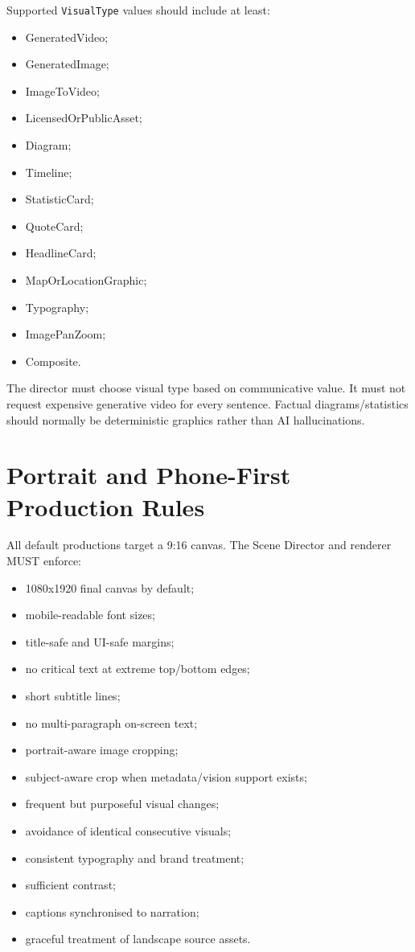 \documentclass[10pt,journal,compsoc]{IEEEtran}
\begin{document}
Supported \texttt{VisualType} values should include at least:
\begin{itemize}
    \item GeneratedVideo;
    \item GeneratedImage;
    \item ImageToVideo;
    \item LicensedOrPublicAsset;
    \item Diagram;
    \item Timeline;
    \item StatisticCard;
    \item QuoteCard;
    \item HeadlineCard;
    \item MapOrLocationGraphic;
    \item Typography;
    \item ImagePanZoom;
    \item Composite.
\end{itemize}

The director must choose visual type based on communicative value. It must not request expensive generative video for every sentence. Factual diagrams/statistics should normally be deterministic graphics rather than AI hallucinations.

\section{Portrait and Phone-First Production Rules}

All default productions target a 9:16 canvas. The Scene Director and renderer MUST enforce:
\begin{itemize}
    \item 1080x1920 final canvas by default;
    \item mobile-readable font sizes;
    \item title-safe and UI-safe margins;
    \item no critical text at extreme top/bottom edges;
    \item short subtitle lines;
    \item no multi-paragraph on-screen text;
    \item portrait-aware image cropping;
    \item subject-aware crop when metadata/vision support exists;
    \item frequent but purposeful visual changes;
    \item avoidance of identical consecutive visuals;
    \item consistent typography and brand treatment;
    \item sufficient contrast;
    \item captions synchronised to narration;
    \item graceful treatment of landscape source assets.
\end{itemize}
\end{document}
